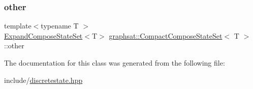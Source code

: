 \mbox{\label{classgraphsat_1_1_compact_compose_state_set_a4ef448e71ad29452d64c8d625dd49bef}} 
\subsubsection{\texorpdfstring{other}{other}}
{\footnotesize\ttfamily template$<$typename T $>$ \\
\mbox{\hyperlink{classgraphsat_1_1_expand_compose_state_set}{Expand\+Compose\+State\+Set}}$<$T$>$ \mbox{\hyperlink{classgraphsat_1_1_compact_compose_state_set}{graphsat\+::\+Compact\+Compose\+State\+Set}}$<$ T $>$\+::other\hspace{0.3cm}{\ttfamily [private]}}



The documentation for this class was generated from the following file\+:\begin{DoxyCompactItemize}
\item 
include/\mbox{\hyperlink{discretestate_8hpp}{discretestate.\+hpp}}\end{DoxyCompactItemize}

